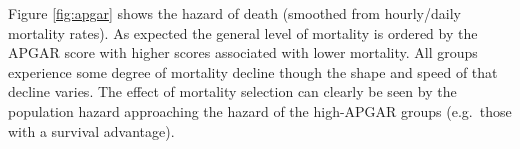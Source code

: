 \documentclass[12pt, parskip=half]{scrartcl}
\begin{document}

Figure \ref{fig:apgar} shows the hazard of death (smoothed from hourly/daily mortality rates). As expected the general level of mortality is ordered by the APGAR score with higher scores associated with lower mortality. All groups experience some degree of mortality decline though the shape and speed of that decline varies. The effect of mortality selection can clearly be seen by the population hazard approaching the hazard of the high-APGAR groups (e.g.~those with a survival advantage).

\end{document}
